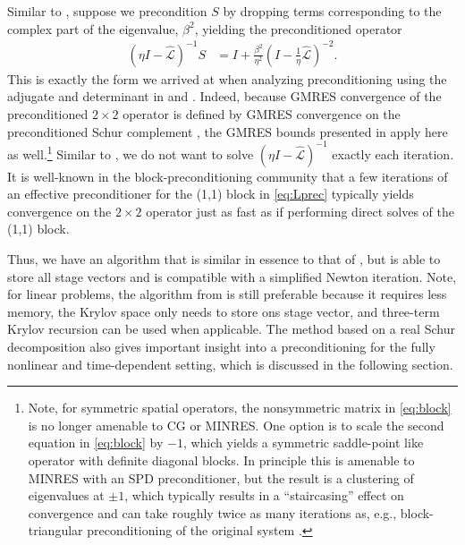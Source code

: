 \documentclass[review]{siamart}
\begin{document}
Similar to , suppose we precondition $S$ by dropping
terms corresponding to the complex part of the eigenvalue, $\beta^2$, yielding the
preconditioned operator
%
\begin{align}
(\eta I - \widehat{\mathcal{L}})^{-1}S &
= I + \frac{\beta^2}{\eta^2} (I - \tfrac{1}{\eta}\widehat{\mathcal{L}})^{-2}.
\label{eq:prec2}
\end{align}
%
This is exactly the form we arrived at when analyzing preconditioning using the
adjugate and determinant in  and . Indeed, because
GMRES convergence of the preconditioned $2\times 2$ operator is defined by GMRES
convergence on the preconditioned Schur complement \cite{2x2block}, the GMRES
bounds presented in  apply here as well.\footnote{Note, for
symmetric spatial operators, the nonsymmetric matrix in \eqref{eq:block}
is no longer amenable to CG or MINRES. One option is to scale the second 
equation in \eqref{eq:block} by $-1$, which yields a symmetric saddle-point
like operator with definite diagonal blocks. In principle this is amenable
to MINRES with an SPD preconditioner, but the result is a clustering of
eigenvalues at $\pm 1$, which typically results in a ``staircasing'' effect
on convergence and can take roughly twice as many iterations as, e.g.,
block-triangular preconditioning of the original system \cite{Fischer:1998vj}.}
Similar to , we do not
want to solve $(\eta I - \widehat{\mathcal{L}})^{-1}$ exactly each iteration. It
is well-known in the block-preconditioning community that a few iterations of
an effective preconditioner for the (1,1) block in \eqref{eq:Lprec} typically
yields convergence on the $2\times 2$ operator just as fast as if performing
direct solves of the (1,1) block.

Thus, we have an algorithm that is similar in essence to that of ,
but is able to store all stage vectors and is compatible with a simplified Newton
iteration. Note, for linear problems, the algorithm from  is still
preferable because it requires less memory, the Krylov space only needs to store
ons stage vector, and three-term Krylov recursion can be used when applicable. 
The method based on a real Schur decomposition
also gives important insight into a preconditioning for the fully nonlinear
and time-dependent setting, which is discussed in the following section. 
\end{document}
